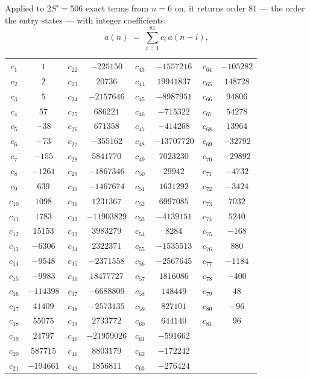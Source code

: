 \documentclass[11pt,a4paper]{article}
\theoremstyle{plain}
\theoremstyle{definition}
\begin{document}
Applied to $2S'=506$ exact terms from $n=6$ on, it returns order $81$ --- the
order the entry states --- with integer coefficients:
\[
a(n)\;=\;\sum_{i=1}^{81}c_i\,a(n-i),
\]
\begin{center}\small
\begin{tabular}{cccccccc}
$c_{1}$ & $1$ & $c_{22}$ & $-225150$ & $c_{43}$ & $-1557216$ & $c_{64}$ & $-105282$ \\
$c_{2}$ & $2$ & $c_{23}$ & $20736$ & $c_{44}$ & $19941837$ & $c_{65}$ & $148728$ \\
$c_{3}$ & $5$ & $c_{24}$ & $-2157646$ & $c_{45}$ & $-8987951$ & $c_{66}$ & $94806$ \\
$c_{4}$ & $57$ & $c_{25}$ & $686221$ & $c_{46}$ & $-715322$ & $c_{67}$ & $54278$ \\
$c_{5}$ & $-38$ & $c_{26}$ & $671358$ & $c_{47}$ & $-414268$ & $c_{68}$ & $13964$ \\
$c_{6}$ & $-73$ & $c_{27}$ & $-355162$ & $c_{48}$ & $-13707720$ & $c_{69}$ & $-32792$ \\
$c_{7}$ & $-155$ & $c_{28}$ & $5841770$ & $c_{49}$ & $7023230$ & $c_{70}$ & $-29892$ \\
$c_{8}$ & $-1261$ & $c_{29}$ & $-1867346$ & $c_{50}$ & $29942$ & $c_{71}$ & $-4732$ \\
$c_{9}$ & $639$ & $c_{30}$ & $-1467674$ & $c_{51}$ & $1631292$ & $c_{72}$ & $-3424$ \\
$c_{10}$ & $1098$ & $c_{31}$ & $1231367$ & $c_{52}$ & $6997085$ & $c_{73}$ & $7032$ \\
$c_{11}$ & $1783$ & $c_{32}$ & $-11903829$ & $c_{53}$ & $-4139151$ & $c_{74}$ & $5240$ \\
$c_{12}$ & $15153$ & $c_{33}$ & $3983279$ & $c_{54}$ & $8284$ & $c_{75}$ & $-168$ \\
$c_{13}$ & $-6306$ & $c_{34}$ & $2322371$ & $c_{55}$ & $-1535513$ & $c_{76}$ & $880$ \\
$c_{14}$ & $-9548$ & $c_{35}$ & $-2371558$ & $c_{56}$ & $-2567645$ & $c_{77}$ & $-1184$ \\
$c_{15}$ & $-9983$ & $c_{36}$ & $18477727$ & $c_{57}$ & $1816086$ & $c_{78}$ & $-400$ \\
$c_{16}$ & $-114398$ & $c_{37}$ & $-6688809$ & $c_{58}$ & $148449$ & $c_{79}$ & $48$ \\
$c_{17}$ & $41409$ & $c_{38}$ & $-2573135$ & $c_{59}$ & $827101$ & $c_{80}$ & $-96$ \\
$c_{18}$ & $55075$ & $c_{39}$ & $2733772$ & $c_{60}$ & $644140$ & $c_{81}$ & $96$ \\
$c_{19}$ & $24797$ & $c_{40}$ & $-21959026$ & $c_{61}$ & $-591662$ &  &  \\
$c_{20}$ & $587715$ & $c_{41}$ & $8803179$ & $c_{62}$ & $-172242$ &  &  \\
$c_{21}$ & $-194661$ & $c_{42}$ & $1856811$ & $c_{63}$ & $-276424$ &  &  \\
\end{tabular}
\end{center}
\end{document}
